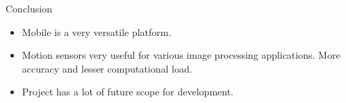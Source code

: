 \documentclass{beamer}
\begin{document}
\begin{frame}{Conclusion}
\begin{itemize}
	\item Mobile is a very versatile platform.
	\item Motion sensors very useful for various image processing applications.
	More accuracy and lesser computational load.
	\item Project has a lot of future scope for development.
\end{itemize}
\end{frame}
\end{document}
